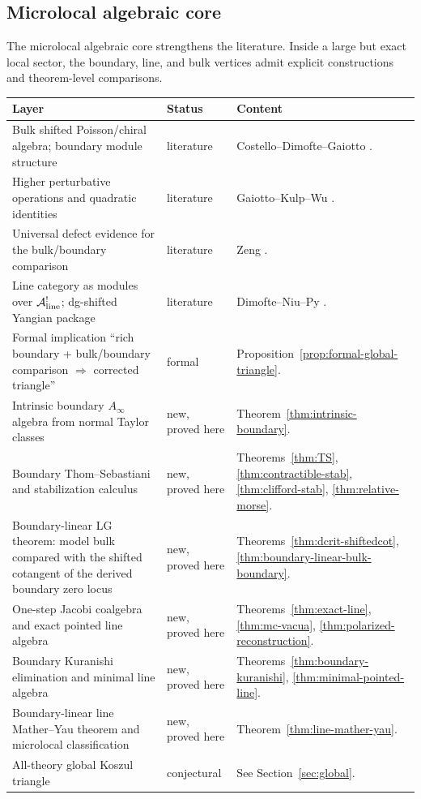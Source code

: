 \subsection{Microlocal algebraic core}

The microlocal algebraic core strengthens the literature. Inside a large but exact local sector, the boundary, line, and bulk vertices admit explicit constructions and theorem-level comparisons.

\begin{center}
\renewcommand{\arraystretch}{1.2}
\begin{longtable}{|p{}|p{}|p{}|}
\hline
\textbf{Layer} & \textbf{Status} & \textbf{Content} \\
\hline
Bulk shifted Poisson/chiral algebra; boundary module structure & literature & Costello--Dimofte--Gaiotto \cite{CDG20}. \\
\hline
Higher perturbative operations and quadratic identities & literature & Gaiotto--Kulp--Wu \cite{GKW25}. \\
\hline
Universal defect evidence for the bulk/boundary comparison & literature & Zeng \cite{Zeng23}. \\
\hline
Line category as modules over $\mathcal{A}^!_{\mathrm{line}}$; dg-shifted Yangian package & literature & Dimofte--Niu--Py \cite{DNP25}. \\
\hline
Formal implication ``rich boundary + bulk/boundary comparison $\Rightarrow$ corrected triangle'' & formal & Proposition~\ref{prop:formal-global-triangle}. \\
\hline
Intrinsic boundary $A_\infty$ algebra from normal Taylor classes & new, proved here & Theorem~\ref{thm:intrinsic-boundary}. \\
\hline
Boundary Thom--Sebastiani and stabilization calculus & new, proved here & Theorems~\ref{thm:TS}, \ref{thm:contractible-stab}, \ref{thm:clifford-stab}, \ref{thm:relative-morse}. \\
\hline
Boundary-linear LG theorem: model bulk compared with the shifted cotangent of the derived boundary zero locus & new, proved here & Theorems~\ref{thm:dcrit-shiftedcot}, \ref{thm:boundary-linear-bulk-boundary}. \\
\hline
One-step Jacobi coalgebra and exact pointed line algebra & new, proved here & Theorems~\ref{thm:exact-line}, \ref{thm:mc-vacua}, \ref{thm:polarized-reconstruction}. \\
\hline
Boundary Kuranishi elimination and minimal line algebra & new, proved here & Theorems~\ref{thm:boundary-kuranishi}, \ref{thm:minimal-pointed-line}. \\
\hline
Boundary-linear line Mather--Yau theorem and microlocal classification & new, proved here & Theorem~\ref{thm:line-mather-yau}. \\
\hline
All-theory global Koszul triangle & conjectural & See Section~\ref{sec:global}. \\
\hline
\end{longtable}
\end{center}


